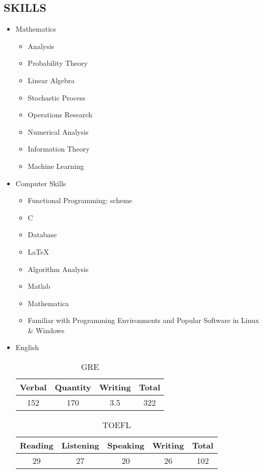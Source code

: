\documentclass{res}
\begin{document}
\begin{resume}
        
\section{SKILLS}
\begin{itemize}

\item Mathematics
\begin{itemize}
\item Analysis
\item Probability Theory
\item Linear Algebra
\item Stochastic Process
\item Operations Research
\item Numerical Analysis
\item Information Theory
\item Machine Learning 
\end{itemize}

\item Computer Skills
\begin{itemize}
\item Functional Programming: scheme
\item C
\item Database
\item \LaTeX\
\item Algorithm Analysis

\item Matlab
\item Mathematica
\item Familiar with Programming Environments and Popular Software in Linux \& Windows
\end{itemize}

\item English
\begin{table}[H]
\begin{center}
\caption*{GRE}
\begin{tabular}{cccc}
\toprule
Verbal   & Quantity & Writing   &Total   \\
\midrule
152 & 170 & 3.5 & 322 \\  
\bottomrule
\end{tabular}
\end{center}
\end{table}


\begin{table}[H]
\begin{center}
\caption*{TOEFL}
\begin{tabular}{ccccc}
\toprule
Reading & Listening  &  Speaking & Writing & Total \\ 
\midrule
29 & 27 & 20 & 26 & 102 \\  
\bottomrule
\end{tabular}
\end{center}
\end{table}


\end{itemize}
\end{resume}
\end{document}
